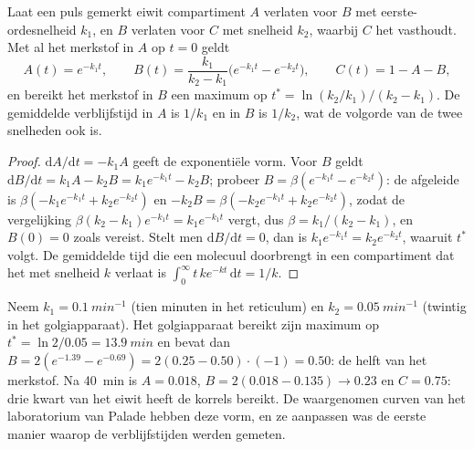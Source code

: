 \begin{theorem}\label{thm:b3:membrane-traffic:pulse-chase}
Laat een puls gemerkt eiwit compartiment $A$ verlaten voor $B$ met
eerste-ordesnelheid $k_{1}$, en $B$ verlaten voor $C$ met snelheid
$k_{2}$, waarbij $C$ het vasthoudt. Met al het merkstof in $A$ op
$t = 0$ geldt
\[
A(t) = e^{-k_{1}t},\qquad
B(t) = \frac{k_{1}}{k_{2} - k_{1}}\bigl(e^{-k_{1}t} - e^{-k_{2}t}\bigr),
\qquad
C(t) = 1 - A - B,
\]
en bereikt het merkstof in $B$ een maximum op
$t^{*} = \ln(k_{2}/k_{1})/(k_{2} - k_{1})$. De gemiddelde verblijfstijd
in $A$ is $1/k_{1}$ en in $B$ is $1/k_{2}$, wat de volgorde van de twee
snelheden ook is.
\end{theorem}
\begin{proof}
$\mathrm{d}A/\mathrm{d}t = -k_{1}A$ geeft de exponentiële vorm. Voor
$B$ geldt
$\mathrm{d}B/\mathrm{d}t = k_{1}A - k_{2}B = k_{1}e^{-k_{1}t} - k_{2}B$;
probeer $B = \beta(e^{-k_{1}t} - e^{-k_{2}t})$: de afgeleide is
$\beta(-k_{1}e^{-k_{1}t} + k_{2}e^{-k_{2}t})$ en $-k_{2}B = \beta(-k_{2}
e^{-k_{1}t} + k_{2}e^{-k_{2}t})$, zodat de vergelijking $\beta(k_{2}
- k_{1})e^{-k_{1}t} = k_{1}e^{-k_{1}t}$ vergt, dus $\beta = k_{1}/(k_{2} -
k_{1})$, en $B(0) = 0$ zoals vereist. Stelt men $\mathrm{d}B/\mathrm{d}t =
0$, dan is $k_{1}e^{-k_{1}t} = k_{2}e^{-k_{2}t}$, waaruit $t^{*}$
volgt. De gemiddelde tijd die een molecuul doorbrengt in een
compartiment dat het met snelheid $k$ verlaat is $\int_{0}^{
\infty} t\,k e^{-kt}\,\mathrm{d}t = 1/k$.
\end{proof}

\begin{example}\label{ex:b3:membrane-traffic:palade}
Neem $k_{1} = \qty{0.1}{min^{-1}}$ (tien minuten in het reticulum) en
$k_{2} = \qty{0.05}{min^{-1}}$ (twintig in het golgiapparaat). Het
golgiapparaat bereikt zijn maximum op
$t^{*} = \ln 2/0.05 = \qty{13.9}{min}$ en bevat dan $B = 2(e^{-1.39} -
e^{-0.69}) = 2(0.25 - 0.50)\cdot(-1) = 0.50$: de helft van het merkstof.
Na \qty{40}{min} is $A = 0.018$, $B = 2(0.018 - 0.135) \to 0.23$ en
$C = 0.75$: drie kwart van het eiwit heeft de korrels bereikt. De
waargenomen curven van het laboratorium van Palade hebben deze vorm, en
ze aanpassen was de eerste manier waarop de verblijfstijden werden
gemeten.
\end{example}

